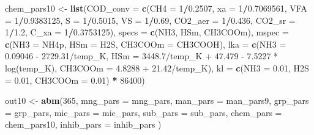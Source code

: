 \documentclass[
]{article}
\newenvironment{Shaded}{\begin{snugshade}}{\end{snugshade}}
\newcommand{\AttributeTok}[1]{\textcolor[rgb]{0.13,0.29,0.53}{#1}}
\newcommand{\DecValTok}[1]{\textcolor[rgb]{0.00,0.00,0.81}{#1}}
\newcommand{\FloatTok}[1]{\textcolor[rgb]{0.00,0.00,0.81}{#1}}
\newcommand{\FunctionTok}[1]{\textcolor[rgb]{0.13,0.29,0.53}{\textbf{#1}}}
\newcommand{\NormalTok}[1]{#1}
\newcommand{\OtherTok}[1]{\textcolor[rgb]{0.56,0.35,0.01}{#1}}
\newcommand{\SpecialCharTok}[1]{\textcolor[rgb]{0.81,0.36,0.00}{\textbf{#1}}}
\newcommand{\StringTok}[1]{\textcolor[rgb]{0.31,0.60,0.02}{#1}}
\begin{document}
\begin{Shaded}
\begin{Highlighting}[]
\NormalTok{chem\_pars10 }\OtherTok{\textless{}{-}} \FunctionTok{list}\NormalTok{(}\AttributeTok{COD\_conv =} \FunctionTok{c}\NormalTok{(}\AttributeTok{CH4 =} \DecValTok{1}\SpecialCharTok{/}\FloatTok{0.2507}\NormalTok{, }\AttributeTok{xa =} \DecValTok{1}\SpecialCharTok{/}\FloatTok{0.7069561}\NormalTok{,}
                               \AttributeTok{VFA =} \DecValTok{1}\SpecialCharTok{/}\FloatTok{0.9383125}\NormalTok{, }\AttributeTok{S =} \DecValTok{1}\SpecialCharTok{/}\FloatTok{0.5015}\NormalTok{, }\AttributeTok{VS =} \DecValTok{1}\SpecialCharTok{/}\FloatTok{0.69}\NormalTok{, }
                               \AttributeTok{CO2\_aer =} \DecValTok{1}\SpecialCharTok{/}\FloatTok{0.436}\NormalTok{, }\AttributeTok{CO2\_sr =} \DecValTok{1}\SpecialCharTok{/}\FloatTok{1.2}\NormalTok{, }
                               \AttributeTok{C\_xa =} \DecValTok{1}\SpecialCharTok{/}\FloatTok{0.3753125}\NormalTok{),}
                   \AttributeTok{specs =} \FunctionTok{c}\NormalTok{(}\StringTok{\textquotesingle{}NH3\textquotesingle{}}\NormalTok{, }\StringTok{\textquotesingle{}HSm\textquotesingle{}}\NormalTok{, }\StringTok{\textquotesingle{}CH3COOm\textquotesingle{}}\NormalTok{),}
                   \AttributeTok{mspec =} \FunctionTok{c}\NormalTok{(}\AttributeTok{NH3 =} \StringTok{\textquotesingle{}NH4p\textquotesingle{}}\NormalTok{, }\AttributeTok{HSm =} \StringTok{\textquotesingle{}H2S\textquotesingle{}}\NormalTok{, }\AttributeTok{CH3COOm =} \StringTok{\textquotesingle{}CH3COOH\textquotesingle{}}\NormalTok{),}
                   \AttributeTok{lka =} \FunctionTok{c}\NormalTok{(}\AttributeTok{NH3 =} \StringTok{\textquotesingle{}{-} 0.09046 {-} 2729.31/temp\_K\textquotesingle{}}\NormalTok{, }
                           \AttributeTok{HSm =} \StringTok{\textquotesingle{}{-} 3448.7/temp\_K + 47.479 {-} 7.5227 * log(temp\_K)\textquotesingle{}}\NormalTok{,}
                           \AttributeTok{CH3COOm =} \StringTok{\textquotesingle{}{-}4.8288 + 21.42/temp\_K\textquotesingle{}}\NormalTok{),}
                   \AttributeTok{kl =} \FunctionTok{c}\NormalTok{(}\AttributeTok{NH3 =} \FloatTok{0.01}\NormalTok{, }\AttributeTok{H2S =} \FloatTok{0.01}\NormalTok{, }\AttributeTok{CH3COOm =} \FloatTok{0.01}\NormalTok{) }\SpecialCharTok{*} \DecValTok{86400}\NormalTok{)}
\end{Highlighting}
\end{Shaded}

\begin{Shaded}
\begin{Highlighting}[]
\NormalTok{out10 }\OtherTok{\textless{}{-}} \FunctionTok{abm}\NormalTok{(}\DecValTok{365}\NormalTok{,}
            \AttributeTok{mng\_pars =}\NormalTok{ mng\_pars,}
            \AttributeTok{man\_pars =}\NormalTok{ man\_pars9,}
            \AttributeTok{grp\_pars =}\NormalTok{ grp\_pars,}
            \AttributeTok{mic\_pars =}\NormalTok{ mic\_pars,}
            \AttributeTok{sub\_pars =}\NormalTok{ sub\_pars,}
            \AttributeTok{chem\_pars =}\NormalTok{ chem\_pars10,}
            \AttributeTok{inhib\_pars =}\NormalTok{ inhib\_pars}
\NormalTok{)}
\end{Highlighting}
\end{Shaded}
\end{document}
